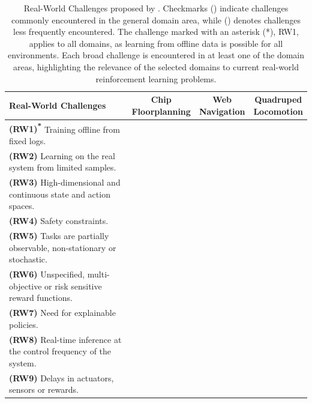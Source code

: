 
\newcommand{\cmark}{\textcolor{green!80!black}{\ding{51}}}
\newcommand{\xmark}{\textcolor{red}{\ding{55}}}

\begin{table}[t!]
    \small
    \centering
    \begin{tabularx}{\textwidth}{>{\raggedright\arraybackslash}Xccc}
        \toprule
        \textbf{Real-World Challenges} & \makecell{Chip \\Floorplanning} & \makecell{Web \\Navigation} & \makecell{Quadruped \\Locomotion}\\ 
        \midrule
        \textbf{(RW1)\textsuperscript{*}} Training offline from fixed logs. & \cmark & \cmark & \cmark \\
        \addlinespace
        \textbf{(RW2)} Learning on the real system from limited samples. & \xmark & \xmark & \cmark \\ 
        \addlinespace
        \textbf{(RW3)} High-dimensional and continuous state and action spaces. & \cmark & \xmark & \cmark \\ 
        \addlinespace
        \textbf{(RW4)} Safety constraints. & \xmark & \cmark & \cmark \\ 
        \addlinespace
        \textbf{(RW5)} Tasks are partially observable, non-stationary or stochastic. & \xmark & \xmark & \cmark \\ 
        \addlinespace
        \textbf{(RW6)} Unspecified, multi-objective or risk sensitive reward functions. & \cmark & \cmark & \cmark \\
        \addlinespace
        \textbf{(RW7)} Need for explainable policies. & \xmark & \cmark & \xmark \\ 
        \addlinespace
        \textbf{(RW8)} Real-time inference at the control frequency of the system. & \xmark & \cmark & \cmark \\ 
        \addlinespace
        \textbf{(RW9)} Delays in actuators, sensors or rewards. & \xmark & \cmark & \cmark  \\ 
        \bottomrule
    \end{tabularx}
    \caption{Real-World Challenges proposed by \citeauthor{dulac2021challenges} \citep{dulac2021challenges}. Checkmarks (\cmark) indicate challenges commonly encountered in the general domain area, while (\xmark) denotes challenges less frequently encountered.
    The challenge marked with an asterisk (*), RW1, applies to all \method domains, as learning from offline data is possible for all environments.
    Each broad challenge is encountered in at least one of the \method domain areas, highlighting the relevance of the selected domains to current real-world reinforcement learning problems.}
    \label{tab:dulac_real_world_challenges}
\end{table}


